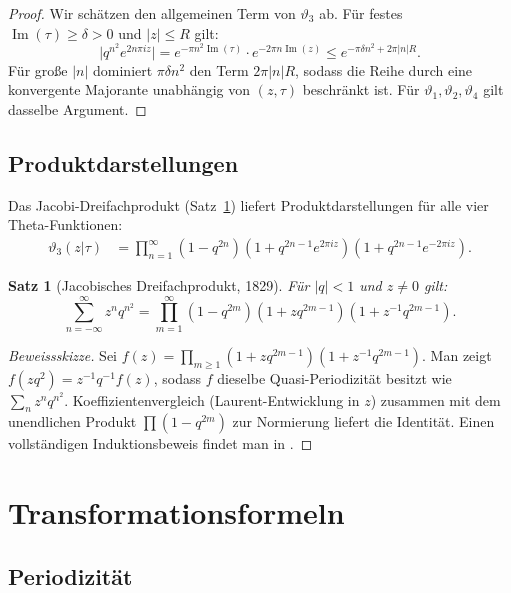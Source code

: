 \documentclass[12pt,a4paper]{amsart}
\newtheorem{theorem}{Satz}[section]
\theoremstyle{definition}
\begin{document}
\begin{proof}
Wir schätzen den allgemeinen Term von $\vartheta_3$ ab.
Für festes $\operatorname{Im}(\tau) \geq \delta > 0$ und $|z| \leq R$ gilt:
\[
  \bigl|q^{n^2} e^{2n\pi iz}\bigr|
  = e^{-\pi n^2 \operatorname{Im}(\tau)} \cdot e^{-2\pi n \operatorname{Im}(z)}
  \leq e^{-\pi \delta n^2 + 2\pi |n| R}.
\]
Für große $|n|$ dominiert $\pi\delta n^2$ den Term $2\pi|n|R$, sodass die Reihe
durch eine konvergente Majorante unabhängig von $(z,\tau)$ beschränkt ist.
Für $\vartheta_1, \vartheta_2, \vartheta_4$ gilt dasselbe Argument.
\end{proof}

\subsection{Produktdarstellungen}

Das Jacobi-Dreifachprodukt (Satz~\ref{thm:triple}) liefert Produktdarstellungen
für alle vier Theta-Funktionen:
\begin{align}
  \vartheta_3(z|\tau) &= \prod_{n=1}^{\infty}
    (1-q^{2n})(1+q^{2n-1}e^{2\pi iz})(1+q^{2n-1}e^{-2\pi iz}).
\end{align}

\begin{theorem}[Jacobisches Dreifachprodukt, 1829]\label{thm:triple}
Für $|q|<1$ und $z \neq 0$ gilt:
\[
  \sum_{n=-\infty}^{\infty} z^n q^{n^2}
  = \prod_{m=1}^{\infty}(1-q^{2m})(1+zq^{2m-1})(1+z^{-1}q^{2m-1}).
\]
\end{theorem}

\begin{proof}[Beweissskizze]
Sei $f(z) = \prod_{m\geq1}(1+zq^{2m-1})(1+z^{-1}q^{2m-1})$.
Man zeigt $f(zq^2) = z^{-1}q^{-1}f(z)$, sodass $f$ dieselbe Quasi-Periodizität
besitzt wie $\sum_n z^n q^{n^2}$.
Koeffizientenvergleich (Laurent-Entwicklung in $z$)
zusammen mit dem unendlichen Produkt $\prod(1-q^{2m})$ zur Normierung
liefert die Identität.
Einen vollständigen Induktionsbeweis findet man in \cite{WhittakerWatson1927}.
\end{proof}

\section{Transformationsformeln}\label{sec:transformation}

\subsection{Periodizität}
\end{document}
